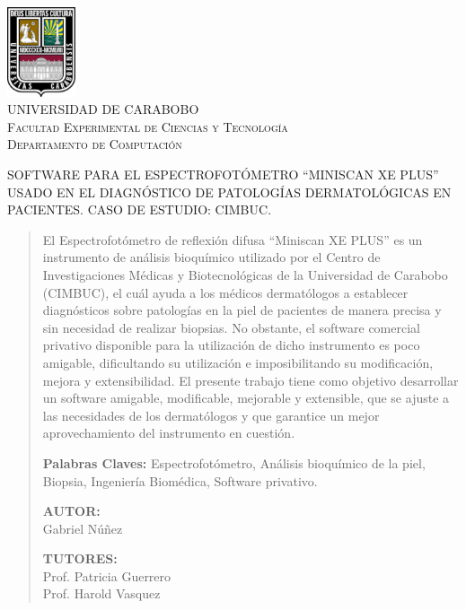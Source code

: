 \documentclass[12pt, a4paper]{article}
\begin{document}
\begin{center}

\includegraphics[width=0.15\textwidth]{./img/logo-uc.png}~\\[1cm]

\textsc{ UNIVERSIDAD DE CARABOBO \\
Facultad Experimental de Ciencias y Tecnolog\'{i}a\\
Departamento de Computaci\'{o}n
}

SOFTWARE PARA EL ESPECTROFOT\'{O}METRO ``MINISCAN XE PLUS'' USADO EN EL DIAGN\'{O}STICO DE PATOLOG\'{I}AS DERMATOL\'{O}GICAS EN PACIENTES. CASO DE ESTUDIO: CIMBUC.

\end{center}
\begin{abstract}
\noindent
El Espectrofot\'{o}metro de reflexi\'{o}n difusa ``Miniscan XE PLUS'' es un instrumento de an\'{a}lisis bioqu\'{i}mico utilizado por el Centro de Investigaciones M\'{e}dicas y Biotecnol\'{o}gicas de la Universidad de Carabobo (CIMBUC), el cu\'{a}l ayuda a los m\'{e}dicos dermat\'{o}logos a establecer diagn\'{o}sticos sobre patolog\'{i}as en la piel de pacientes de manera precisa y sin necesidad de realizar biopsias. No obstante, el software comercial privativo disponible para la utilizaci\'{o}n de dicho instrumento es poco amigable, dificultando su utilizaci\'{o}n e imposibilitando su modificaci\'{o}n, mejora y extensibilidad. El presente trabajo tiene como objetivo desarrollar un software amigable, modificable, mejorable y extensible, que se ajuste a las necesidades de los dermat\'{o}logos y que garantice un mejor aprovechamiento del instrumento en cuesti\'{o}n.

\vfill

\noindent
\textbf{Palabras Claves:} Espectrofot\'{o}metro, An\'{a}lisis bioqu\'{i}mico de la piel, Biopsia, Ingenier\'{i}a Biom\'{e}dica, Software privativo.

\vfill
\begin{minipage}[t]{0.4\textwidth}
\begin{flushleft}
\textbf{AUTOR:}\\
Gabriel N\'{u}\~{n}ez
\end{flushleft}
\end{minipage}%
\begin{minipage}[t]{0.4\textwidth}
\begin{flushright}
\textbf{TUTORES:} \\
Prof. Patricia Guerrero \\
Prof. Harold Vasquez
\end{flushright}
\end{minipage}

\end{abstract}
\pagebreak
\end{document}
